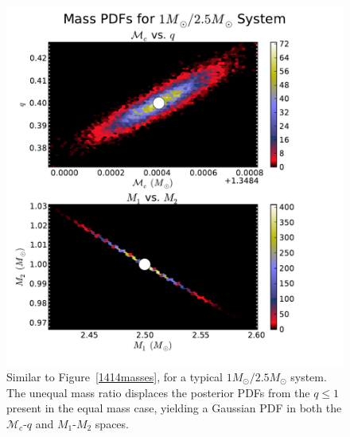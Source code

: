 \documentclass[11pt,a4paper]{emulateapj}
\newcommand{\chmass}{\mathcal{M}_c}
\begin{document}
\begin{figure}[h!]
  \centering
 \includegraphics[trim=0cm 0cm 2cm 0cm, clip=false,scale=0.56]{125masses2D.pdf}
 \caption{Similar to Figure~\ref{1414masses}, for a typical $1M_{\odot}/2.5M_{\odot}$ system.  The unequal mass ratio displaces the posterior PDFs from the $q \leq 1$ present in the equal mass case, yielding a Gaussian PDF in both the $\chmass$-$q$ and $M_1$-$M_2$ spaces.}
  \label{125masses}
\end{figure}
\end{document}
